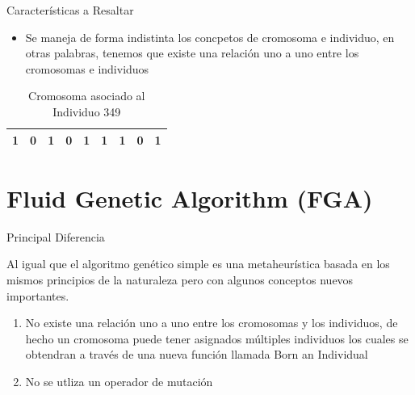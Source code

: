 \documentclass[10pt]{beamer}
\begin{document}
\begin{frame}{Características a Resaltar}
  
  
  \begin{itemize}
  		\item Se maneja de forma indistinta los concpetos de cromosoma e individuo,
  			en otras palabras, tenemos que existe una relación uno a uno entre los
  			cromosomas e individuos
  			
 	\end{itemize}
 	\begin{table}
 		\caption{Cromosoma asociado al Individuo 349}
 		\begin{tabular}[t]{|c|c|c|c|c|c|c|c|c|}
			\hline
			1 & 0 & 1 & 0 & 1 & 1 & 1 & 0 & 1\\
			\hline
		\end{tabular}
 	\end{table}
\end{frame}


\section{Fluid Genetic Algorithm (FGA)}

\begin{frame}{Principal Diferencia}

	Al igual que el algoritmo genético simple es una \alert{metaheurística} basada
	en los mismos principios de la naturaleza pero con algunos conceptos nuevos 
	importantes.
	
	\begin{enumerate}
		\item No existe una relación uno a uno entre los cromosomas y los individuos,
		de hecho un cromosoma puede tener asignados múltiples individuos los cuales
		se obtendran a través de una nueva función llamada \alert{Born an Individual}
		
		\item No se utliza un operador de mutación
	\end{enumerate}



\end{frame}
\end{document}

